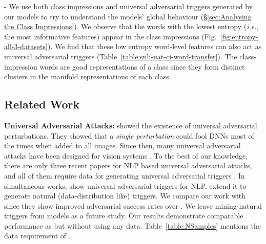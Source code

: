 \noindent- We use both class impressions and universal adversarial triggers generated by our models to try to understand the models' global behaviour (\S\ref{sec:Analysing the Class Impressions}). We observe that the words with the lowest entropy (\textit{i.e.}, the most informative features) appear in the class impressions (Fig.~\ref{fig:entropy-all-3-datasets}). We find that these low entropy word-level features can also act as universal adversarial triggers (Table~\ref{table:snli-uat-ci-word-transfer}). The class-impression words are good representations of a class since they form distinct clusters in the manifold representations of each class.


\subsection{Related Work}
\label{sec:related work}

\textbf{Universal Adversarial Attacks:} \citet{moosavi2017universal} showed the existence of universal adversarial perturbations. They showed that a \textit{single perturbation} could fool DNNs most of the times when added to all images. Since then, many universal adversarial attacks have been designed for vision systems \cite{khrulkov2018art,li2019universal,zhang2021survey}. To the best of our knowledge, there are only three recent papers for NLP based universal adversarial attacks, and all of them require data for generating universal adversarial triggers \cite{wallace2019universal,song2020universal,behjati2019universal}. In simultaneous works, \cite{wallace2019universal,behjati2019universal} show universal adversarial triggers for NLP. \citet{song2020universal} extend it to generate natural (data-distribution like) triggers. We compare our work with \cite{wallace2019universal} since they show improved adversarial success rates over \cite{behjati2019universal}. We leave mining natural triggers from models as a future study. Our results demonstrate comparable performance as \cite{wallace2019universal} but without using any data. Table~\ref{table:NSamples} mentions the data requirement of \cite{wallace2019universal}.


